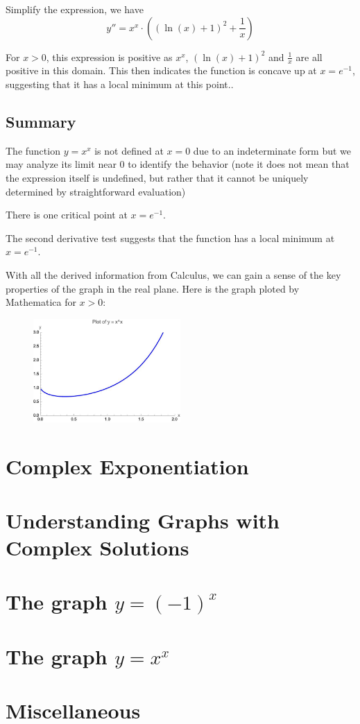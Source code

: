 \documentclass[12pt]{article}
\begin{document}
Simplify the expression, we have
\[ y'' = x^x \cdot ((\ln(x) + 1)^2 + \frac{1}{x}) \]

For $x>0$, this expression is positive as $x^x$, $(\ln(x) + 1)^2$ and $\frac{1}{x}$ are all positive in this domain. 
This then indicates the function is concave up at $x=e^{-1}$, suggesting that it has a local minimum at this point..
\subsection{Summary}

The function \(y = x^x\) is not defined at \(x = 0\) due to an indeterminate form but we may analyze its limit near $0$ to identify the behavior
(note it does not mean that the expression itself is undefined, but rather that it cannot be uniquely determined by straightforward evaluation)

There is one critical point at \(x = e^{-1}\).

The second derivative test suggests that the function has a local minimum at \(x = e^{-1}\).

With all the derived information from Calculus, we can gain a sense of the key properties of the graph in the real plane. 
Here is the graph ploted by Mathematica for $x>0$:
\begin{figure}[h]
    \centering
    \includegraphics[width=0.5\textwidth]{x-power-x-real.jpeg}
    \label{fig:realPlot}
\end{figure}  
\section{Complex Exponentiation}


\section{Understanding Graphs with Complex Solutions}

\section[Math in Section]{The graph $y = (-1)^x$}

\section[Math in Section]{The graph $y = x^x$}

\section{Miscellaneous}
\end{document}
